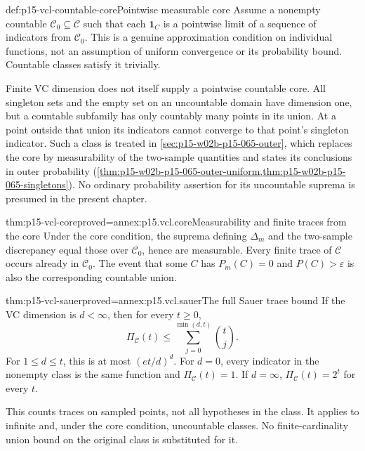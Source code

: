 \begin{hbdefinition}{def:p15-vcl-countable-core}{Pointwise measurable core}
Assume a nonempty countable \(\mathcal C_0\subseteq\mathcal C\)
such that each \(\mathbf1_C\) is a pointwise limit of a sequence
of indicators from \(\mathcal C_0\). This is a genuine approximation
condition on individual functions, not an assumption of uniform convergence
or its probability bound. Countable classes satisfy it trivially.
\end{hbdefinition}

Finite VC dimension does not itself supply a pointwise countable core.
All singleton sets and the empty set on an uncountable domain have dimension
one, but a countable subfamily has only countably many points in its union.
At a point outside that union its indicators cannot converge to that point's
singleton indicator. Such a class is treated in
\cref{sec:p15-w02b-p15-065-outer}, which replaces the core by measurability
of the two-sample quantities and states its conclusions in outer probability
(\cref{thm:p15-w02b-p15-065-outer-uniform,thm:p15-w02b-p15-065-singletons}).
No ordinary probability assertion for its uncountable suprema is presumed
in the present chapter.

\begin{hblemma}{thm:p15-vcl-core}{proved=annex:p15.vcl.core}{Measurability and finite traces from the core}
Under the core condition, the suprema defining \(\Delta_m\) and the
two-sample discrepancy equal those over \(\mathcal C_0\), hence are
measurable. Every finite trace of \(\mathcal C\) occurs already in
\(\mathcal C_0\). The event that some \(C\) has \(P_m(C)=0\)
and \(P(C)>\varepsilon\) is also the corresponding countable union.
\end{hblemma}

\begin{hbtheorem}{thm:p15-vcl-sauer}{proved=annex:p15.vcl.sauer}{The full Sauer trace bound}
If the VC dimension is \(d<\infty\), then for every \(t\geq0\),
\[
 \Pi_{\mathcal C}(t)\leq\sum_{j=0}^{\min(d,t)}\binom tj.
\]
For \(1\leq d\leq t\), this is at most \((et/d)^d\).
For \(d=0\), every indicator in the nonempty class is the same
function and \(\Pi_{\mathcal C}(t)=1\). If \(d=\infty\),
\(\Pi_{\mathcal C}(t)=2^t\) for every \(t\).
\end{hbtheorem}

This counts traces on sampled points, not all hypotheses in the class.
It applies to infinite and, under the core condition, uncountable classes.
No finite-cardinality union bound on the original class is substituted for it.


